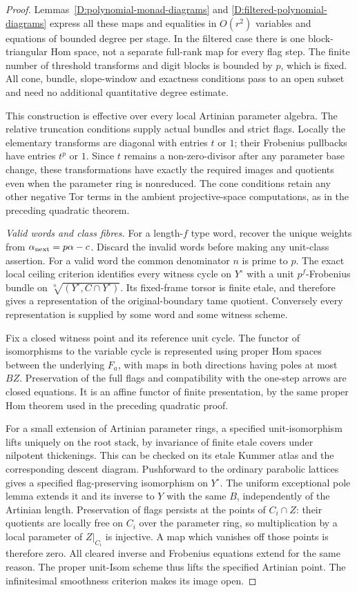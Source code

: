 \begin{proof}
Lemmas~\ref{D:polynomial-monad-diagrams} and
\ref{D:filtered-polynomial-diagrams} express
all these maps and equalities in $O(r^2)$
variables and equations of bounded degree
per stage.  In the filtered case there is
one block-triangular Hom space, not a
separate full-rank map for every flag step.
The finite number of threshold transforms
and digit blocks is bounded by $p$, which
is fixed.  All cone, bundle, slope-window
and exactness conditions pass to an open
subset and need no additional quantitative
degree estimate.

This construction is effective over every
local Artinian parameter algebra.  The
relative truncation conditions supply actual
bundles and strict flags.  Locally the
elementary transforms are diagonal with
entries $t$ or $1$; their Frobenius pullbacks
have entries $t^p$ or $1$.  Since $t$ remains
a non-zero-divisor after any parameter base
change, these transformations have exactly
the required images and quotients even
when the parameter ring is nonreduced.
The cone conditions retain any other
negative Tor terms in the ambient
projective-space computations, as in the
preceding quadratic theorem.

\emph{Valid words and class fibres.}
For a length-$f$ type word, recover the unique
weights from $\alpha_{\rm next}=p\alpha-c$.
Discard the invalid words before making any
unit-class assertion.  For a valid word
the common denominator $n$ is prime to $p$.
The exact local ceiling criterion identifies
every witness cycle on $Y^\circ$ with a
unit $p^f$-Frobenius bundle on
$\sqrt[n]{(Y^\circ,C\cap Y^\circ)}$.
Its fixed-frame torsor is finite etale,
and therefore gives a representation of
the original-boundary tame quotient.
Conversely every representation is supplied
by some word and some witness scheme.

Fix a closed witness point and its reference
unit cycle.  The functor of isomorphisms to
the variable cycle is represented using
proper Hom spaces between the underlying
$F_a$, with maps in both directions having
poles at most $BZ$.  Preservation of the
full flags and compatibility with the
one-step arrows are closed equations.
It is an affine functor of finite
presentation, by the same proper Hom
theorem used in the preceding quadratic
proof.

For a small extension of Artinian parameter
rings, a specified unit-isomorphism lifts
uniquely on the root stack, by invariance
of finite etale covers under nilpotent
thickenings.  This can be checked on its
etale Kummer atlas and the corresponding
descent diagram.  Pushforward to the
ordinary parabolic lattices gives a
specified flag-preserving isomorphism
on $Y^\circ$.  The uniform exceptional
pole lemma extends it and its inverse
to $Y$ with the same $B$, independently
of the Artinian length.  Preservation
of flags persists at the points of
$C_i\cap Z$: their quotients are locally
free on $C_i$ over the parameter ring,
so multiplication by a local parameter
of $Z|_{C_i}$ is injective.  A map
which vanishes off those points is
therefore zero.
All cleared inverse and Frobenius
equations extend for the same reason.
The proper unit-Isom scheme thus lifts
the specified Artinian point.  The
infinitesimal smoothness criterion
makes its image open.


\end{proof}
